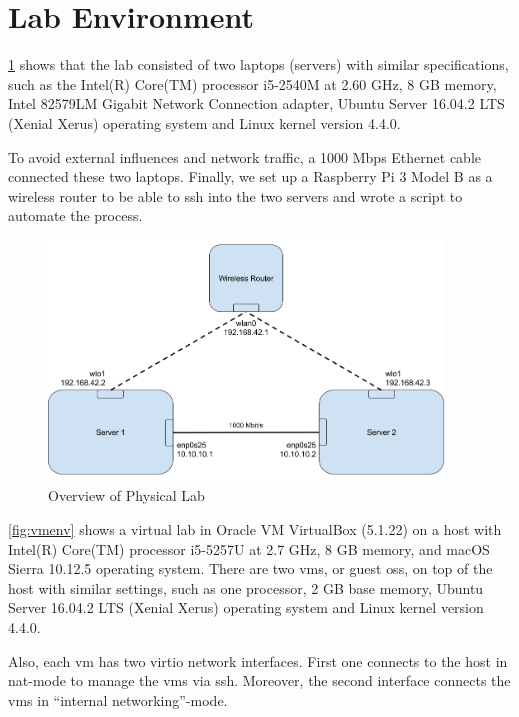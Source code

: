 \section{Lab Environment}\label{section:labenv}

\cref{fig:labenv} shows that the lab consisted of two laptops (servers) with similar specifications, such as the Intel(R) Core(TM) processor i5-2540M at 2.60 GHz, 8 GB memory, Intel 82579LM Gigabit Network Connection adapter, Ubuntu Server 16.04.2 LTS (Xenial Xerus) operating system and Linux kernel version 4.4.0.

\skippara To avoid external influences and network traffic, a 1000 Mbps Ethernet cable connected these two laptops.
Finally, we set up a Raspberry Pi 3 Model B as a wireless router to be able to \acrshort{ssh} into the two servers and wrote a script to automate the process.

\begin{figure}[h!]
    \centering
    \includegraphics[width=10.5cm]{figure/labenv}
    \caption{Overview of Physical Lab}
    \label{fig:labenv}
\end{figure}

\skippara \cref{fig:vmenv} shows a virtual lab in Oracle VM VirtualBox (5.1.22) on a host with Intel(R) Core(TM) processor i5-5257U at 2.7 GHz, 8 GB memory, and macOS Sierra 10.12.5 operating system.
There are two \glspl{vm}, or guest \glspl{os}, on top of the host with similar settings, such as one processor, 2 GB base memory, Ubuntu Server 16.04.2 LTS (Xenial Xerus) operating system and Linux kernel version 4.4.0.

\skippara Also, each \gls{vm} has two virtio network interfaces.
First one connects to the host in \gls{nat}-mode to manage the \glspl{vm} via \acrshort{ssh}.
Moreover, the second interface connects the \gls{vm}s in ``internal networking''-mode.

